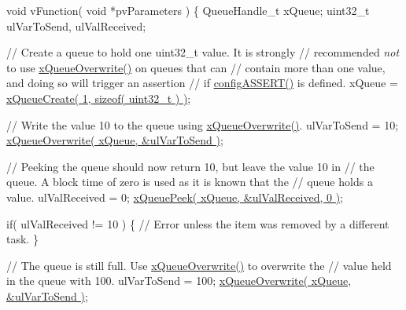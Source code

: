 \begin{DoxyPre}void vFunction( void *pvParameters )
\{
QueueHandle\_t xQueue;
uint32\_t ulVarToSend, ulValReceived;\end{DoxyPre}



\begin{DoxyPre} // Create a queue to hold one uint32\_t value.  It is strongly
 // recommended {\itshape not} to use \hyperlink{externals_2freertos_2include_2queue_8h_a8e9ced123b5a0e37a36d3bbdb2e56b4e}{xQueueOverwrite()} on queues that can
 // contain more than one value, and doing so will trigger an assertion
 // if \hyperlink{externals_2freertos_2include_2_free_r_t_o_s_8h_a228c70cd48927d6ab730ed1a6dfbe35f}{configASSERT()} is defined.
 xQueue = \hyperlink{vendor_2ceedling_2plugins_2freertos_2src_2freertos_2include_2queue_8h_aeb858b824bd74a934ea7ebb81af2a6bb}{xQueueCreate( 1, sizeof( uint32\_t ) )};\end{DoxyPre}



\begin{DoxyPre} // Write the value 10 to the queue using \hyperlink{externals_2freertos_2include_2queue_8h_a8e9ced123b5a0e37a36d3bbdb2e56b4e}{xQueueOverwrite()}.
 ulVarToSend = 10;
 \hyperlink{externals_2freertos_2include_2queue_8h_a8e9ced123b5a0e37a36d3bbdb2e56b4e}{xQueueOverwrite( xQueue, &ulVarToSend )};\end{DoxyPre}



\begin{DoxyPre} // Peeking the queue should now return 10, but leave the value 10 in
 // the queue.  A block time of zero is used as it is known that the
 // queue holds a value.
 ulValReceived = 0;
 \hyperlink{vendor_2ceedling_2plugins_2freertos_2src_2freertos_2include_2queue_8h_a2df70733bb875477cd9614c5b3446257}{xQueuePeek( xQueue, &ulValReceived, 0 )};\end{DoxyPre}



\begin{DoxyPre} if( ulValReceived != 10 )
 \{
     // Error unless the item was removed by a different task.
 \}\end{DoxyPre}



\begin{DoxyPre} // The queue is still full.  Use \hyperlink{externals_2freertos_2include_2queue_8h_a8e9ced123b5a0e37a36d3bbdb2e56b4e}{xQueueOverwrite()} to overwrite the
 // value held in the queue with 100.
 ulVarToSend = 100;
 \hyperlink{externals_2freertos_2include_2queue_8h_a8e9ced123b5a0e37a36d3bbdb2e56b4e}{xQueueOverwrite( xQueue, &ulVarToSend )};\end{DoxyPre}



